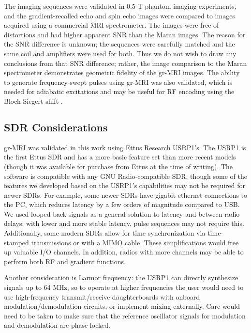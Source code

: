 \documentclass[10pt,letterpaper]{article}
\begin{document}
\par The imaging sequences were validated in 0.5 T phantom imaging experiments, 
and the gradient-recalled echo and 
spin echo images were compared to images acquired using a commercial MRI spectrometer.
The images were free of distortions and had higher apparent SNR than the Maran images. 
The reason for the SNR difference is unknown; the sequences were carefully matched and the same
coil and amplifiers were used for both. 
Thus we do not wish to draw any conclusions from that SNR difference;
rather, the image comparison to the Maran spectrometer demonstrates geometric fidelity of 
the gr-MRI images.
The ability to generate frequency-swept pulses using gr-MRI was also validated, 
which is needed for adiabatic excitations \cite{Garwood:2001:J-Magn-Reson:11740891}
and may be useful for RF encoding using the Bloch-Siegert shift \cite{kartausch:13,cao:ismrm14}. 

\subsection*{SDR Considerations}
gr-MRI was validated in this work using Ettus Research USRP1's.
The USRP1 is the first Ettus SDR and has a more basic feature set than 
more recent models (though it was available for purchase from Ettus at the time of writing). 
The software is compatible with any GNU Radio-compatible SDR,
though some of the features we developed based on the USRP1's capabilities 
may not be required for newer SDRs.
For example, some newer SDRs have gigabit ethernet connections to the PC,
which reduces latency by a few orders of magnitude compared to USB. 
We used looped-back signals as a general solution to latency and between-radio delays;
with lower and more stable latency, pulse sequences may not require this.
Additionally, some modern SDRs allow for time synchronization via time-stamped transmissions 
or with a MIMO cable.
These simplifications would free up valuable I/O channels.
In addition, 
radios with more channels may be able to perform both RF and gradient functions. 

\par Another consideration is Larmor frequency: 
the USRP1 can directly synthesize signals up to 64 MHz, 
so to operate at higher frequencies the user would need to use high-frequency transmit/receive daughterboards with onboard modulation/demodulation circuits,
or implement mixing externally.
Care would need to be taken to make sure that the reference oscillator signals for modulation
and demodulation are phase-locked.
\end{document}
